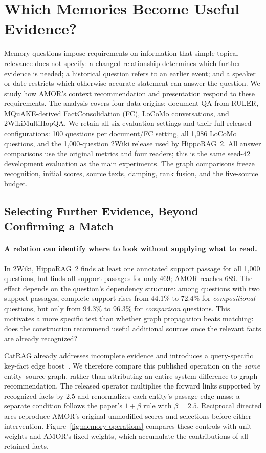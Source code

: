 \section{Which Memories Become Useful Evidence?}
\label{sec:memory-use}

Memory questions impose requirements on information that simple topical relevance does not specify: a changed relationship determines which further evidence is needed; a historical question refers to an earlier event; and a speaker or date restricts which otherwise accurate statement can answer the question.
We study how AMOR's context recommendation and presentation respond to these requirements.
The analysis covers four data origins: document QA from RULER, MQuAKE-derived FactConsolidation (FC), LoCoMo conversations, and 2WikiMultiHopQA.
We retain all six evaluation settings and their full released configurations: 100 questions per document/FC setting, all 1,986 LoCoMo questions, and the 1,000-question 2Wiki release used by HippoRAG~2.
All answer comparisons use the original metrics and four readers; this is the same seed-42 development evaluation as the main experiments.
The graph comparisons freeze recognition, initial scores, source texts, damping, rank fusion, and the five-source budget.

\subsection{Selecting Further Evidence, Beyond Confirming a Match}
\label{sec:memory-evidence}

\paragraph{A relation can identify where to look without supplying what to read.}
In 2Wiki, HippoRAG~2 finds at least one annotated support passage for all 1,000 questions, but finds all support passages for only 469; AMOR reaches 689.
The effect depends on the question's dependency structure: among questions with two support passages, complete support rises from 44.1\% to 72.4\% for \emph{compositional} questions, but only from 94.3\% to 96.3\% for \emph{comparison} questions.
This motivates a more specific test than whether graph propagation beats matching: does the construction recommend useful additional sources once the relevant facts are already recognized?

CatRAG already addresses incomplete evidence and introduces a query-specific key-fact edge boost~\citep{lau-etal-2026-breaking}.
We therefore compare this published operation on the \emph{same} entity--source graph, rather than attributing an entire system difference to graph recommendation.
The released operator multiplies the forward links supported by recognized facts by 2.5 and renormalizes each entity's passage-edge mass; a separate condition follows the paper's $1+\beta$ rule with $\beta=2.5$.
Reciprocal directed arcs reproduce AMOR's original unmodified scores and selections before either intervention.
Figure~\ref{fig:memory-operations} compares these controls with unit weights and AMOR's fixed weights, which accumulate the contributions of all retained facts.


